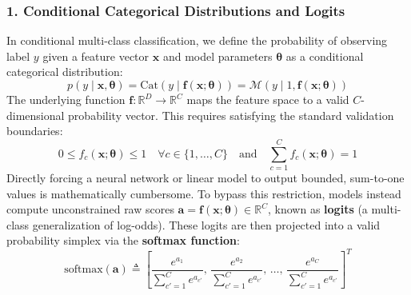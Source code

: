 \documentclass{article}
\begin{document}
\subsubsection*{1. Conditional Categorical Distributions and Logits}
In conditional multi-class classification, we define the probability of observing label $y$ given a feature vector $\boldsymbol{x}$ and model parameters $\boldsymbol{\theta}$ as a conditional categorical distribution:
\begin{equation}
    p(y \mid \boldsymbol{x}, \boldsymbol{\theta}) = \text{Cat}(y \mid \boldsymbol{f}(\boldsymbol{x}; \boldsymbol{\theta})) = \mathcal{M}(y \mid 1, \boldsymbol{f}(\boldsymbol{x}; \boldsymbol{\theta}))
\end{equation}
The underlying function $\boldsymbol{f}: \mathbb{R}^D \to \mathbb{R}^C$ maps the feature space to a valid $C$-dimensional probability vector. This requires satisfying the standard validation boundaries:
\begin{equation}
    0 \le f_c(\boldsymbol{x}; \boldsymbol{\theta}) \le 1 \quad \forall c \in \{1,\dots,C\} \quad \text{and} \quad \sum_{c=1}^{C} f_c(\boldsymbol{x}; \boldsymbol{\theta}) = 1
\end{equation}
Directly forcing a neural network or linear model to output bounded, sum-to-one values is mathematically cumbersome. To bypass this restriction, models instead compute unconstrained raw scores $\boldsymbol{a} = \boldsymbol{f}(\boldsymbol{x}; \boldsymbol{\theta}) \in \mathbb{R}^C$, known as \textbf{logits} (a multi-class generalization of log-odds). These logits are then projected into a valid probability simplex via the \textbf{softmax function}:
\begin{equation}
    \text{softmax}(\boldsymbol{a}) \triangleq \left[ \frac{e^{a_1}}{\sum_{c'=1}^{C} e^{a_{c'}}}, \, \frac{e^{a_2}}{\sum_{c'=1}^{C} e^{a_{c'}}}, \, \dots, \, \frac{e^{a_C}}{\sum_{c'=1}^{C} e^{a_{c'}}} \right]^T
\end{equation}
\end{document}
